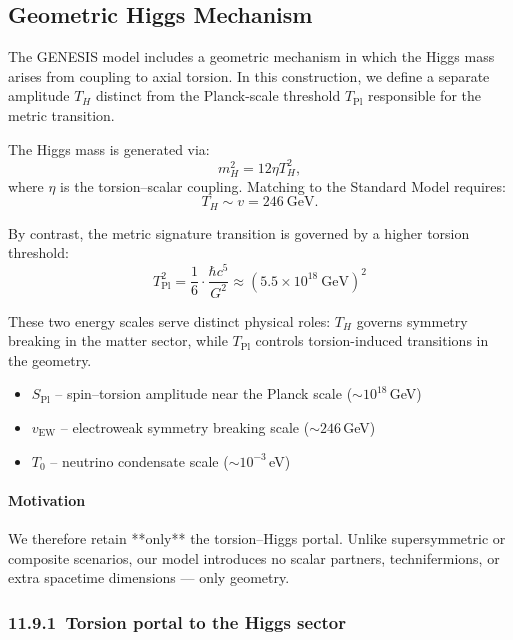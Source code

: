 \documentclass{article}
\begin{document}
\subsection{Geometric Higgs Mechanism}
\label{subsec:geometric_higgs}

The GENESIS model includes a geometric mechanism in which the Higgs mass arises from coupling to axial torsion. In this construction, we define a separate amplitude \( T_H \) distinct from the Planck-scale threshold \( T_{\mathrm{Pl}} \) responsible for the metric transition.

The Higgs mass is generated via:
\[
m_H^2 = 12 \eta T_H^2,
\]
where \( \eta \) is the torsion–scalar coupling. Matching to the Standard Model requires:
\[
T_H \sim v = 246\ \mathrm{GeV}.
\]

By contrast, the metric signature transition is governed by a higher torsion threshold:
\[
T_{\mathrm{Pl}}^2 = \frac{1}{6} \cdot \frac{\hbar c^5}{G^2} \approx \left(5.5 \times 10^{18}\ \mathrm{GeV}\right)^2
\]

These two energy scales serve distinct physical roles: \( T_H \) governs symmetry breaking in the matter sector, while \( T_{\mathrm{Pl}} \) controls torsion-induced transitions in the geometry.






\begin{itemize}
  \item $S_{\text{Pl}}$ – spin–torsion amplitude near the Planck scale ($\sim 10^{18}$ GeV)
  \item $v_{\text{EW}}$ – electroweak symmetry breaking scale ($\sim 246$ GeV)
  \item $T_0$ – neutrino condensate scale ($\sim 10^{-3}$ eV)
\end{itemize}



\paragraph{Motivation} We therefore retain **only** the torsion–Higgs portal. Unlike supersymmetric or composite scenarios, our model introduces no scalar partners, technifermions, or extra spacetime dimensions — only geometry.


\subsubsection*{11.9.1 Torsion portal to the Higgs sector}
\end{document}
